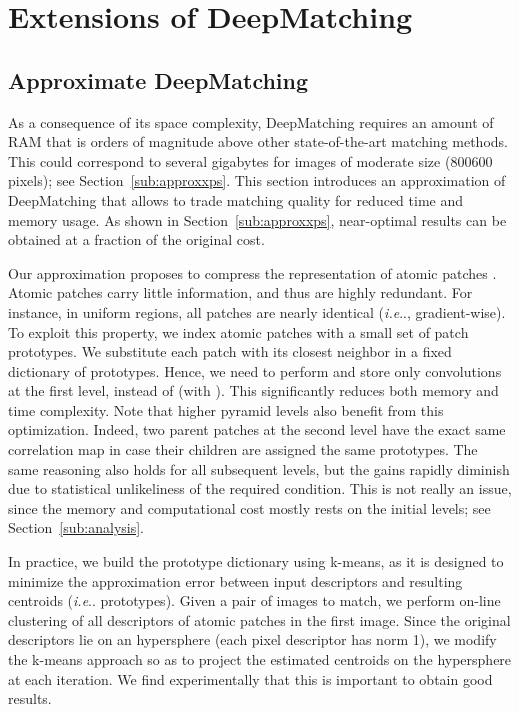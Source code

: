 \documentclass[twocolumn,natbib]{svjour3}
\makeatletter
\DeclareRobustCommand\onedot{\futurelet\@let@token\@onedot}
\def\@onedot{\ifx\@let@token.\else.\null\fi\xspace}
\def\ie{\emph{i.e}\onedot} \def\Ie{\emph{I.e}\onedot}
\makeatother
\begin{document}
 \section{Extensions of DeepMatching}
\label{sec:extensions}

\subsection{Approximate DeepMatching}
\label{sub:compr}

As a consequence of its  space complexity,
DeepMatching requires an amount of RAM that is 
orders of magnitude above other state-of-the-art matching methods.
This could correspond to several gigabytes for images of moderate size (800600 pixels); see Section~\ref{sub:approxxps}. 
This section introduces an approximation of DeepMatching that allows
to trade matching quality for reduced time and memory usage. 
As shown in Section~\ref{sub:approxxps}, near-optimal
results can be obtained at a fraction of the original cost.

Our approximation proposes to
compress the representation of atomic patches . 
Atomic patches carry little information, and thus
are highly redundant. For instance, in uniform regions, all patches
are nearly identical (\ie, gradient-wise).
To exploit this property, we index atomic
patches with a small set of patch prototypes. We substitute
each patch with its closest neighbor in a fixed dictionary of  prototypes.
Hence, we need to perform and store only  convolutions at the first level, instead of 
(with ). This significantly reduces both memory and time complexity. 
Note that higher pyramid levels also
benefit from this optimization. Indeed, two parent
patches at the second level have the exact same correlation map in case their
children are assigned the same prototypes.
The same reasoning also holds for all subsequent
levels, but the gains rapidly diminish due to
statistical unlikeliness of the required condition. This is not really an issue,
since the memory and computational cost mostly rests on the initial 
levels; see Section~\ref{sub:analysis}.

In practice, we build the prototype dictionary using k-means, as it
is designed to minimize the approximation error between
input descriptors and resulting centroids (\ie prototypes). Given
a pair of images to match, we perform on-line clustering of all descriptors of 
atomic patches   in the first image. Since  the original descriptors
lie on an hypersphere (each pixel descriptor  has norm 1),
we modify the k-means approach  so as to project the estimated centroids on the hypersphere at each iteration.
We find experimentally that this is important to obtain good results.
\end{document}
